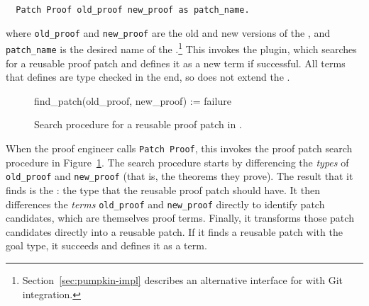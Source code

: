 \begin{lstlisting}
  Patch Proof old_proof new_proof as patch_name. 
\end{lstlisting}
where \lstinline{old_proof} and \lstinline{new_proof} are the old and new versions of the ,
and \lstinline{patch_name} is the desired name of the .\footnote{Section~\ref{sec:pumpkin-impl} describes an alternative interface for \sysname with Git integration.} This invokes the \sysname plugin, which searches for a reusable proof patch
and defines it as a new term if successful.
All terms that \sysname defines are type checked in the end, so \sysname does not extend the .

\begin{figure}
\begin{algorithmic}
\renewcommand{\thealgorithm}{}
\footnotesize
\STATE \hspace{-0.5cm} \footnotesize{find\_patch(old\_proof, new\_proof) :=}
    \STATE {}
    \STATE {}
      \STATE {}
    \ENDIF
    \RETURN failure
\end{algorithmic}
\caption{Search procedure for a reusable proof patch in \sysname.}
\label{alg:patching}	
\end{figure}

When the proof engineer calls \lstinline{Patch Proof}, this invokes the proof patch search procedure in Figure~\ref{alg:patching}.
The search procedure starts by differencing the \textit{types} of \lstinline{old_proof} and \lstinline{new_proof}
(that is, the theorems they prove).
The result that it finds is the : the type that the reusable proof patch should have.
It then differences the \textit{terms} \lstinline{old_proof} and \lstinline{new_proof} directly to identify patch candidates,
which are themselves proof terms.
Finally, it transforms those patch candidates directly into a reusable patch.
If it finds a reusable patch with the goal type, it succeeds and defines it as a term.

